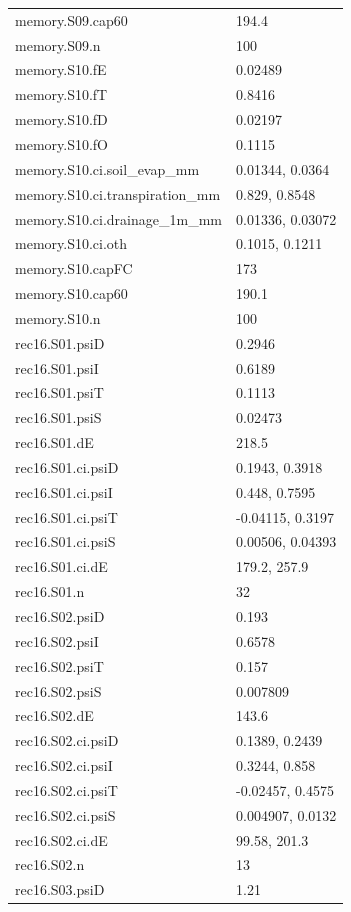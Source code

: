 {\begin{longtable}{p{}p{}}
{}memory.S09.cap60 & 194.4\\
{}memory.S09.n & 100\\
{}memory.S10.fE & 0.02489\\
{}memory.S10.fT & 0.8416\\
{}memory.S10.fD & 0.02197\\
{}memory.S10.fO & 0.1115\\
{}memory.S10.ci.soil\_evap\_mm & 0.01344, 0.0364\\
{}memory.S10.ci.transpiration\_mm & 0.829, 0.8548\\
{}memory.S10.ci.drainage\_1m\_mm & 0.01336, 0.03072\\
{}memory.S10.ci.oth & 0.1015, 0.1211\\
{}memory.S10.capFC & 173\\
{}memory.S10.cap60 & 190.1\\
{}memory.S10.n & 100\\
{}rec16.S01.psiD & 0.2946\\
{}rec16.S01.psiI & 0.6189\\
{}rec16.S01.psiT & 0.1113\\
{}rec16.S01.psiS & 0.02473\\
{}rec16.S01.dE & 218.5\\
{}rec16.S01.ci.psiD & 0.1943, 0.3918\\
{}rec16.S01.ci.psiI & 0.448, 0.7595\\
{}rec16.S01.ci.psiT & -0.04115, 0.3197\\
{}rec16.S01.ci.psiS & 0.00506, 0.04393\\
{}rec16.S01.ci.dE & 179.2, 257.9\\
{}rec16.S01.n & 32\\
{}rec16.S02.psiD & 0.193\\
{}rec16.S02.psiI & 0.6578\\
{}rec16.S02.psiT & 0.157\\
{}rec16.S02.psiS & 0.007809\\
{}rec16.S02.dE & 143.6\\
{}rec16.S02.ci.psiD & 0.1389, 0.2439\\
{}rec16.S02.ci.psiI & 0.3244, 0.858\\
{}rec16.S02.ci.psiT & -0.02457, 0.4575\\
{}rec16.S02.ci.psiS & 0.004907, 0.0132\\
{}rec16.S02.ci.dE & 99.58, 201.3\\
{}rec16.S02.n & 13\\
{}rec16.S03.psiD & 1.21\\

\end{longtable}}
